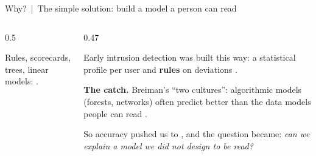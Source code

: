 \documentclass[aspectratio=169,10pt]{beamer}
\begin{document}
\begin{frame}{Why? \,|\, The simple solution: build a model a person can read}
\begin{columns}[T]
\begin{column}{0.5\textwidth}
\begin{sfig}[0.6]
\end{sfig}
\vspace{1mm}

{\footnotesize\centering Rules, scorecards, trees, linear models: .\par}
\end{column}
\begin{column}{0.47\textwidth}
{\footnotesize
Early intrusion detection was built this way: a statistical profile per user and \textbf{rules} on deviations .

\vspace{2mm}
\textbf{The catch.} Breiman's ``two cultures'': algorithmic models (forests, networks) often predict better than the data models people can read .

\vspace{2mm}
So accuracy pushed us to , and the question became: \emph{can we explain a model we did not design to be read?}}
\end{column}
\end{columns}
\end{frame}
\end{document}
